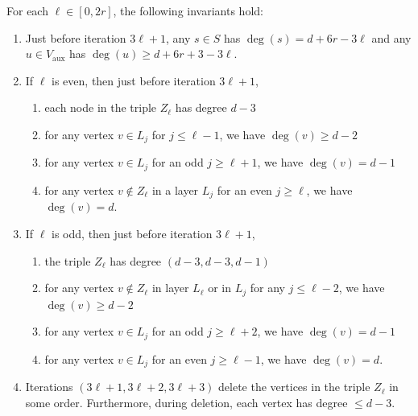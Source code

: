 \documentclass[11pt,letterpaper]{article}
\renewcommand{\geq}{\geqslant}
\renewcommand{\leq}{\leqslant}
\theoremstyle{definition}
\newcommand{\Vaux}{V_{\text{aux}}}
\begin{document}
\begin{lemma}\label{lem:redn-inv}
For each $\ell\in [0,2r]$, the following invariants hold:
    \begin{enumerate}
    \item[Inv.~(1).] Just before iteration $3\ell+1$, any $s\in S$ has $\deg(s)=d+6r-3\ell$ and any $u\in \Vaux$ has $\deg(u)\geq d+6r+3-3\ell$.
     \item[Inv.~(2).] If $\ell$ is even, then just before iteration $3\ell+1$, 
    \begin{enumerate}
        \item each node in the triple $Z_{\ell}$ has degree $d-3$ 
        \item for any vertex $v\in L_{j}$ for $j\leq \ell-1$, we have $\deg(v)\geq d-2$
        \item for any vertex $v\in L_{j}$ for an odd $j \geq \ell+1$, we have $\deg(v)= d-1$ 
        \item for any vertex $v\not\in Z_{\ell}$ in a layer $L_j$ for an even $j\geq \ell$, we have $\deg(v) = d$.
    \end{enumerate}
    \item[Inv.~(3).] If $\ell$ is odd, then just before iteration $3\ell+1$,
     \begin{enumerate}
         \item the triple $Z_{\ell}$ has degree $(d-3,d-3,d-1)$
          \item for any vertex $v\not\in Z_{\ell}$ in layer $L_{\ell}$ or in $L_j$ for any $j\leq \ell-2$, we have $\deg(v)\geq d-2$
        \item for any vertex $v\in L_j$ for an odd $j\geq \ell+2$, we have $\deg(v)= d-1$ 
        \item for any vertex $v\in L_j$ for an even $j\geq \ell-1$, we have $\deg(v)= d$.
     \end{enumerate}
      \item[Inv.~(4).] Iterations $(3\ell+1,3\ell+2,3\ell+3)$ delete the vertices in the triple $Z_\ell$ in some order. Furthermore, during deletion, each vertex has degree $\leq d-3$.
\end{enumerate}  
\end{lemma}
\end{document}
